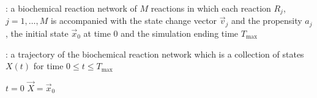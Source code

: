 \begin{algorithm}[H]
\DontPrintSemicolon
{}

\caption{\protect\TitleFunction{}}

\Input: a biochemical reaction network of $M$ reactions in which each reaction $R_j$, $j=1, \dots, M$ is accompanied with the state change vector $\vec{v}_j$ and the propensity $a_j$, the initial state $\vec{x}_0$ at time $0$ and the simulation ending time $T_{\max}$\;

\Output: a trajectory of the biochemical reaction network which is a collection of states $X(t)$ for time $0\le t\le T_{\max}$\;

$t = 0$\;
$\vec{X} = \vec{x}_0$\;


\label{algo:ssa-sketch}
\end{algorithm}
